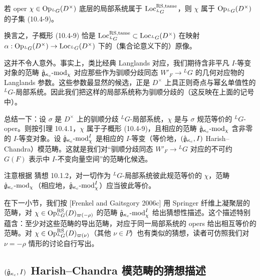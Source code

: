 \begin{lemma}\label{lem:u16-tame-pre}
    若 oper $\chi\in\operatorname{Op}_{{}^L G}(D^\times)$ 底层的局部系统属于 $\operatorname{Loc}^{\mathrm{RS,tame}}_{{}^L G}$，则 $\chi$ 属于 $\operatorname{Op}_{{}^L G}(D^\times)$ 的子集 (10.4-9)。
\end{lemma}

换言之，子概形 (10.4-9) 恰是 $\operatorname{Loc}^{\mathrm{RS,tame}}_{{}^L G}\subset\operatorname{Loc}_{{}^L G}(D^\times)$ 在映射 $\alpha:\operatorname{Op}_{{}^L G}(D^\times)\to\operatorname{Loc}_{{}^L G}(D^\times)$ 下的（集合论意义下的）原像。

这并不令人意外。事实上，类比经典 Langlands 对应，我们期待含非平凡 $I$-等变对象的范畴 $\hat{\mathfrak{g}}_{\kappa_c}\text{-}\mathrm{mod}_\chi$ 对应那些作为驯顺分歧同态 $W'_F\to{}^L G$ 的几何对应物的 Langlands 参数。这些参数最显然的候选，正是 $D^\times$ 上具正则奇点与幂幺单值性的 ${}^L G$-局部系统。因此我们把这样的局部系统称为驯顺分歧的（这反映在上面的记号中）。

总结一下：设 $\sigma$ 是 $D^\times$ 上的驯顺分歧 ${}^L G$-局部系统，$\chi$ 是与 $\sigma$ 规范等价的 ${}^L G$-oper。则按引理 10.4.1，$\chi$ 属于子概形 (10.4-9)，且相应的范畴 $\hat{\mathfrak{g}}_{\kappa_c}\text{-}\mathrm{mod}_\chi$ 含非零的 $I$-等变对象。设 $\hat{\mathfrak{g}}_{\kappa_c}\text{-}\mathrm{mod}_\chi^I$ 是相应的 $I$-等变（等价地，$(\hat{\mathfrak{g}}_{\kappa_c},I)$ Harish--Chandra）模范畴。这就是我们对“驯顺分歧同态 $W'_F\to{}^L G$ 对应的不可约 $G(F)$ 表示中 $I$-不变向量空间”的范畴化候选。

注意根据 猜想 10.1.2，对一切作为 ${}^L G$-局部系统彼此规范等价的 $\chi$，范畴 $\hat{\mathfrak{g}}_{\kappa_c}\text{-}\mathrm{mod}_\chi$（相应地，$\hat{\mathfrak{g}}_{\kappa_c}\text{-}\mathrm{mod}_\chi^I$）应当彼此等价。

在下一小节，我们按 [Frenkel and Gaitsgory 2006c] 用 Springer 纤维上凝聚层的范畴，对 $\chi\in\operatorname{Op}^{\mathrm{RS}}_{{}^L G}(D)_{\varpi(-\rho)}$ 的范畴 $\hat{\mathfrak{g}}_{\kappa_c}\text{-}\mathrm{mod}_\chi^I$ 给出猜想性描述。这个描述特别蕴含：至少对这些范畴的导出范畴，对应于同一局部系统的 opers 给出相互等价的范畴。对 $\chi\in\operatorname{Op}^{\mathrm{RS}}_{{}^L G}(D)_{\varpi(\nu)}$（其他 $\nu\in P$）也有类似的猜想，读者可仿照我们对 $\nu=-\rho$ 情形的讨论自行写出。

\subsection{\texorpdfstring{$(\hat{\mathfrak{g}}_{\kappa_c},I)$}{(g_kc,I)} Harish--Chandra 模范畴的猜想描述}

